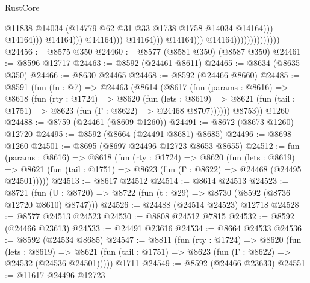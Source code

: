 \begin{lexlean}{RustCore}
\begin{coremodule}
                                                                  @11838
                                                                  @14034
                                                                  (@14779
                                                                    @62
                                                                    @31
                                                                    @33
                                                                    @1738
                                                                    @1758
                                                                    @14034
                                                                    @14164)))
                                                              @14164)))
                                                        @14164)))
                                                  @14164)))
                                            @14164)))
                                      @14164)))
                                @14164))))))))))))))
@24456 := @8575 @350
@24460 := @8577 (@8581 @350) (@8587 @350)
@24461 := @8596 @12717
@24463 := @8592 (@24461 @8611)
@24465 := @8634 (@8635 @350)
@24466 := @8630 @24465
@24468 := @8592 (@24466 @8660)
@24485 := @8591
    (fun (fn : @7) =>
    @24463
      (@8614
        (@8617
          (fun (params : @8616) =>
          @8618
            (fun (rty : @1724) =>
            @8620
              (fun (lets : @8619) =>
              @8621 (fun (tail : @1751) => @8623 (fun (Γ : @8622) => @24468 @8707))))))
        @8753))
    @1260
@24488 := @8759 (@24461 (@8609 @1260))
@24491 := @8672 (@8673 @1260) @12720
@24495 := @8592 (@8664 (@24491 @8681) @8685)
@24496 := @8698 @1260
@24501 := @8695 (@8697 @24496 @12723 @8653 @8655)
@24512 := fun (params : @8616) =>
  @8618
    (fun (rty : @1724) =>
    @8620
      (fun (lets : @8619) =>
      @8621 (fun (tail : @1751) => @8623 (fun (Γ : @8622) => @24468 (@24495 @24501)))))
@24513 := @8617 @24512
@24514 := @8614 @24513
@24523 := @8721
    (fun (U : @8720) => @8722 (fun (t : @29) => @8730 (@8592 (@8736 @12720 @8610) @8747)))
@24526 := @24488 (@24514 @24523) @12718
@24528 := @8577 @24513 @24523
@24530 := @8808 @24512 @7815
@24532 := @8592 (@24466 @23613)
@24533 := @24491 @23616
@24534 := @8664 @24533
@24536 := @8592 (@24534 @8685)
@24547 := @8811
    (fun (rty : @1724) =>
    @8620
      (fun (lets : @8619) =>
      @8621 (fun (tail : @1751) => @8623 (fun (Γ : @8622) => @24532 (@24536 @24501)))))
    @1711
@24549 := @8592 (@24466 @23633)
@24551 := @11617 @24496 @12723

\end{coremodule}
\end{lexlean}
